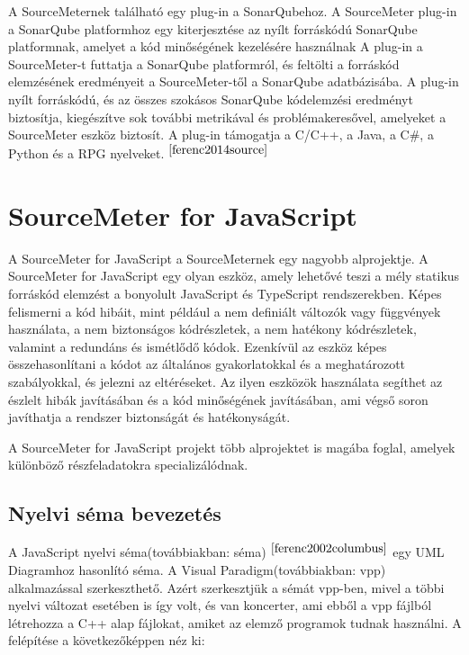 \noindent

A SourceMeternek található egy plug-in a SonarQubehoz.
A SourceMeter plug-in a SonarQube platformhoz egy kiterjesztése az nyílt forráskódú SonarQube platformnak, amelyet a kód minőségének kezelésére használnak
A plug-in a SourceMeter-t futtatja a SonarQube platformról, és feltölti a forráskód elemzésének eredményeit a SourceMeter-től a SonarQube adatbázisába.
A plug-in nyílt forráskódú, és az összes szokásos SonarQube kódelemzési eredményt biztosítja, kiegészítve sok további metrikával és problémakeresővel, amelyeket a SourceMeter eszköz biztosít.
A plug-in támogatja a C/C++, a Java, a C\#, a Python és a RPG nyelveket.$^{~\cite{ferenc2014source}}$

\section{SourceMeter for JavaScript}

\noindent

A SourceMeter for JavaScript a SourceMeternek egy nagyobb alprojektje.
A SourceMeter for JavaScript egy olyan eszköz, amely lehetővé teszi a mély statikus forráskód elemzést a bonyolult JavaScript és TypeScript rendszerekben.
Képes felismerni a kód hibáit, mint például a nem definiált változók vagy függvények használata, a nem biztonságos kódrészletek, a nem hatékony kódrészletek, valamint a redundáns és ismétlődő kódok.
Ezenkívül az eszköz képes összehasonlítani a kódot az általános gyakorlatokkal és a meghatározott szabályokkal, és jelezni az eltéréseket.
Az ilyen eszközök használata segíthet az észlelt hibák javításában és a kód minőségének javításában, ami végső soron javíthatja a rendszer biztonságát és hatékonyságát.

\noindent

A SourceMeter for JavaScript projekt több alprojektet is magába foglal, amelyek különböző részfeladatokra specializálódnak.

\subsection{Nyelvi séma bevezetés}\label{chap:nyelvi_sema}
A JavaScript nyelvi séma(továbbiakban: séma)$^{~\cite{ferenc2002columbus}}$  egy UML Diagramhoz hasonlító séma.
A Visual Paradigm(továbbiakban: vpp) alkalmazással szerkeszthető.
Azért szerkesztjük a sémát vpp-ben, mivel a többi nyelvi változat esetében is így volt, és van koncerter, ami ebből a vpp fájlból létrehozza a C++ alap fájlokat, amiket az elemző programok tudnak használni.
A felépítése a következőképpen néz ki:

